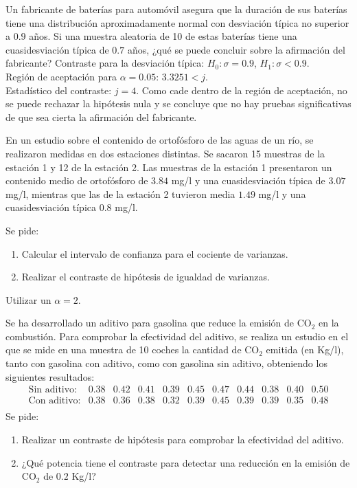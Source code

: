 {Un fabricante de baterías para automóvil asegura que la duración de sus baterías tiene una distribución
aproximadamente normal con desviación típica no superior a $0.9$ años.
Si una muestra aleatoria de 10 de estas baterías tiene una cuasidesviación típica de $0.7$ años, ¿qué se puede concluir
sobre la afirmación del fabricante?
}
{Contraste para la desviación típica: $H_0:\sigma=0.9$, $H_1:\sigma<0.9$.\\
Región de aceptación para $\alpha=0.05$: $3.3251<j$.\\
Estadístico del contraste: $j=4$. Como cade dentro de la región de aceptación, no se puede rechazar la hipótesis
nula y se concluye que no hay pruebas significativas de que sea cierta la afirmación del fabricante.
}
{}


{En un estudio sobre el contenido de ortofósforo de las aguas de un río, se realizaron medidas en dos estaciones distintas.
Se sacaron 15 muestras de la estación 1 y 12 de la estación 2.
Las muestras de la estación 1 presentaron un contenido medio de ortofósforo de $3.84$ mg/l y una cuasidesviación típica
de $3.07$ mg/l, mientras que las de la estación 2 tuvieron media $1.49$ mg/l y una cuasidesviación típica $0.8$ mg/l.

Se pide:
\begin{enumerate}
\item Calcular el intervalo de confianza para el cociente de varianzas.
\item Realizar el contraste de hipótesis de igualdad de varianzas.
\end{enumerate}
Utilizar un $\alpha=2$.
}
{}
{}


{Se ha desarrollado un aditivo para gasolina que reduce la emisión de CO$_2$ en la combustión.
Para comprobar la efectividad del aditivo, se realiza un estudio en el que se mide en una muestra de 10 coches la
cantidad de CO$_2$ emitida (en Kg/l), tanto con gasolina con aditivo, como con gasolina sin aditivo, obteniendo los
siguientes resultados:
\[
\begin{array}{rcccccccccc}
\mbox{Sin aditivo:}  & 0.38 & 0.42 & 0.41 & 0.39 & 0.45 & 0.47 & 0.44 & 0.38 & 0.40 & 0.50  \\
\mbox{Con  aditivo:} & 0.38 & 0.36 & 0.38 & 0.32 & 0.39 & 0.45 & 0.39 & 0.39 & 0.35 & 0.48 \\
\end{array}
\]
Se pide:
\begin{enumerate}
\item Realizar un contraste de hipótesis para comprobar la efectividad del aditivo.
\item ¿Qué potencia tiene el contraste para detectar una reducción en la emisión de CO$_2$ de $0.2$ Kg/l?
\end{enumerate}
}
{}
{}


